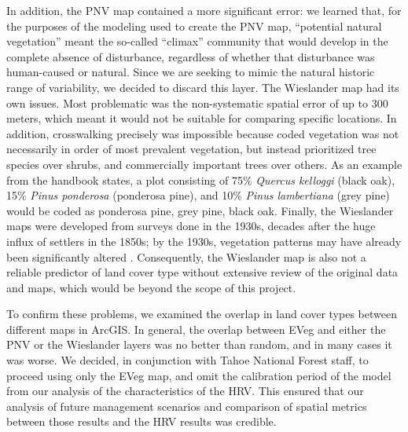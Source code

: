 In addition, the PNV map contained a more significant error: we learned that, for the purposes of the modeling used to create the PNV map, ``potential natural vegetation'' meant the so-called ``climax'' community that would develop in the complete absence of disturbance, regardless of whether that disturbance was human-caused or natural. Since we are seeking to mimic the natural historic range of variability, we decided to discard this layer. The Wieslander map had its own issues. Most problematic was the non-systematic spatial error of up to 300 meters, which meant it would not be suitable for comparing specific locations. In addition, crosswalking precisely was impossible because coded vegetation was not necessarily in order of most prevalent vegetation, but instead prioritized tree species over shrubs, and commercially important trees over others. As an example from the handbook states, a plot consisting of 75\% \emph{Quercus kelloggi} (black oak), 15\% \emph{Pinus ponderosa} (ponderosa pine), and 10\% \emph{Pinus lambertiana} (grey pine) would be coded as ponderosa pine, grey pine, black oak. Finally, the Wieslander maps were developed from surveys done in the 1930s, decades after the huge influx of settlers in the 1850s; by the 1930s, vegetation patterns may have already been significantly altered \citep{Thorne2006}. Consequently, the Wieslander map is also not a reliable predictor of land cover type without extensive review of the original data and maps, which would be beyond the scope of this project. 

To confirm these problems, we examined the overlap in land cover types between different maps in ArcGIS. In general, the overlap between EVeg and either the PNV or the Wieslander layers was no better than random, and in many cases it was worse. We decided, in conjunction with Tahoe National Forest staff, to proceed using only the EVeg map, and omit the calibration period of the model from our analysis of the characteristics of the HRV. This ensured that our analysis of future management scenarios and comparison of spatial metrics between those results and the HRV results was credible.

